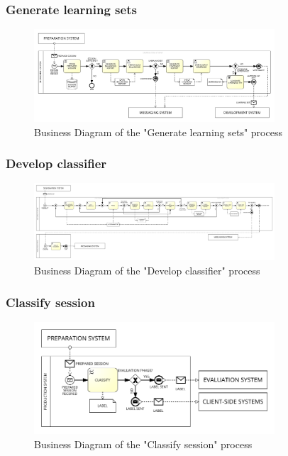 \subsubsection{Generate learning sets}
\label{sec:bpmn_generate_learning_sets}

\begin{figure}[H]
\centering
\includegraphics[width=0.8\textwidth]{figures/Business Diagram - Generate Learning Sets.png}
\caption{Business Diagram of the "Generate learning sets" process}
\label{fig:bpmn_generate_learning_sets}
\end{figure}

\subsubsection{Develop classifier}
\label{sec:bpmn_develop_classifier}

\begin{figure}[H]
\centering
\includegraphics[width=0.8\textwidth]{figures/Business Diagram - Develop Classifier.png}
\caption{Business Diagram of the "Develop classifier" process}
\label{fig:bpmn_develop_classifier}
\end{figure}

\subsubsection{Classify session}
\label{sec:bpmn_classify_session}

\begin{figure}[H]
\centering
\includegraphics[width=0.8\textwidth]{figures/Business Diagram - Classify Session.png}
\caption{Business Diagram of the "Classify session" process}
\label{fig:bpmn_classify_session}
\end{figure}

